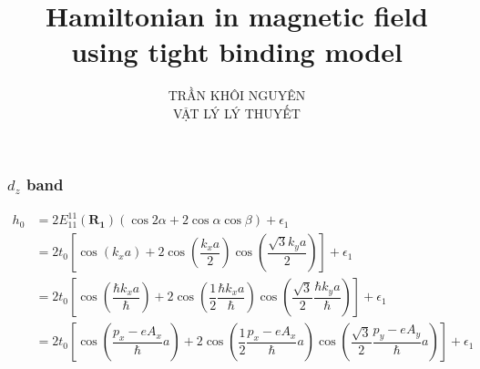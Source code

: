 \documentclass{report}
\title{\Huge{Hamiltonian in magnetic field using tight binding model}}
\newcommand{\f}[2]{\dfrac{#1}{#2}}
\begin{document}
\setlength{\parindent}{20pt}
\newpage
\author{TRẦN KHÔI NGUYÊN \\ VẬT LÝ LÝ THUYẾT}
\maketitle
\subsubsection*{$d_z$ band}
\begin{align*}
	h_0
	 & = 2 E_{11}^{11}\left(\mathbf{R_1}\right) \left(\cos2\alpha + 2\cos\alpha \cos\beta\right) + \epsilon_1                                                                                                                                                                                                                                                                                                                                                                                           \\
	 & = 2t_{0} \left[ \cos(k_x a) + 2 \cos \left(\f{k_x a}{2}\right) \cos \left(\f{\sqrt{3}k_y a}{2}\right) \right] + \epsilon_1                                                                                                                                                                                                                                                                                                                                                                       \\
	 & = 2t_{0} \left[ \cos(\f{\hbar k_x a}{\hbar}) + 2 \cos \left(\f{1}{2}\f{\hbar k_x a}{\hbar}\right) \cos \left(\f{\sqrt{3}}{2}\f{\hbar k_y a}{\hbar}\right) \right] + \epsilon_1                                                                                                                                                                                                                                                                                                                   \\
	 & = 2t_{0} \left[ \cos(\f{p_x - e A_x}{\hbar}a) + 2 \cos \left(\f{1}{2}\f{p_x - e A_x}{\hbar}a\right) \cos\left(\f{\sqrt{3}}{2}\f{p_y - e A_y}{\hbar}a\right) \right] + \epsilon_1                                                                                                                                                                                                                                                                                                                 \\

\end{align*}
\end{document}
